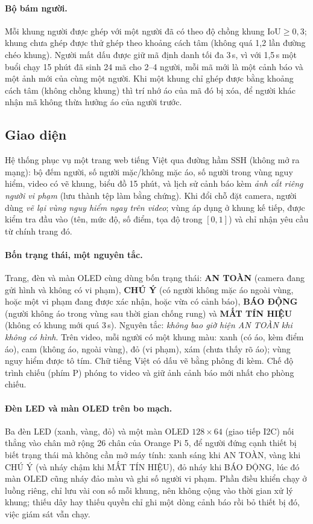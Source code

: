 \documentclass[12pt,a4paper]{article}
\begin{document}
\paragraph{Bộ bám người.} Mỗi khung người được ghép với một người đã có theo độ chồng khung $\text{IoU}\ge0{,}3$; khung chưa ghép được thử
ghép theo khoảng cách tâm (không quá 1,2 lần đường chéo khung). Người mất dấu được giữ mã định danh tối đa 3\,s, vì với 1,5\,s một buổi chạy
15 phút đã sinh 24 mã cho 2--4 người, mỗi mã mới là một cảnh báo và một ảnh mới của cùng một người. Khi một khung chỉ ghép được bằng khoảng
cách tâm (không chồng khung) thì trí nhớ áo của mã đó bị xóa, để người khác nhận mã không thừa hưởng áo của người trước.

\subsection{Giao diện}

Hệ thống phục vụ một trang web tiếng Việt qua đường hầm SSH (không mở ra mạng): bộ đếm người, số người mặc/không mặc
áo, số người trong vùng nguy hiểm, video có vẽ khung, biểu đồ 15 phút, và lịch sử cảnh báo kèm \emph{ảnh cắt riêng
người vi phạm} (lưu thành tệp làm bằng chứng). Khi đổi chỗ đặt camera, người dùng \emph{vẽ lại vùng nguy hiểm ngay
trên video}; vùng áp dụng ở khung kế tiếp, được kiểm tra đầu vào (tên, mức độ, số điểm, tọa độ trong $[0,1]$) và chỉ
nhận yêu cầu từ chính trang đó.

\paragraph{Bốn trạng thái, một nguyên tắc.} Trang, đèn và màn OLED cùng dùng bốn trạng thái: \textbf{AN TOÀN} (camera đang gửi hình và không có vi phạm),
\textbf{CHÚ Ý} (có người không mặc áo ngoài vùng, hoặc một vi phạm đang được xác nhận, hoặc vừa có cảnh báo), \textbf{BÁO ĐỘNG} (người không áo trong vùng
sau thời gian chống rung) và \textbf{MẤT TÍN HIỆU} (không có khung mới quá 3\,s). Nguyên tắc: \emph{không bao giờ hiện AN TOÀN khi không có hình}.
Trên video, mỗi người có một khung màu: xanh (có áo, kèm điểm áo), cam (không áo, ngoài vùng), đỏ (vi phạm), xám (chưa thấy rõ áo); vùng nguy hiểm được tô tím.
Chữ tiếng Việt có dấu vẽ bằng phông đi kèm. Chế độ trình chiếu (phím P) phóng to video và giữ ảnh cảnh báo mới nhất cho phòng chiếu.

\paragraph{Đèn LED và màn OLED trên bo mạch.} Ba đèn LED (xanh, vàng, đỏ) và một màn OLED $128\times64$ (giao tiếp I2C) nối thẳng vào chân mở rộng 26 chân của
Orange Pi 5, để người đứng cạnh thiết bị biết trạng thái mà không cần mở máy tính: xanh sáng khi AN TOÀN, vàng khi CHÚ Ý (và nháy chậm khi MẤT TÍN HIỆU), đỏ nháy khi
BÁO ĐỘNG, lúc đó màn OLED cũng nháy đảo màu và ghi số người vi phạm. Phần điều khiển chạy ở luồng riêng, chỉ lưu vài con số mỗi khung, nên không
cộng vào thời gian xử lý khung; thiếu dây hay thiếu quyền chỉ ghi một dòng cảnh báo rồi bỏ thiết bị đó, việc giám sát vẫn chạy.
\end{document}
